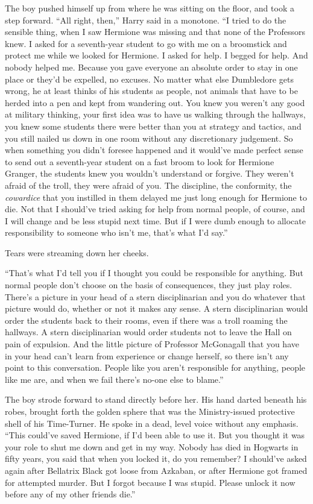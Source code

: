 The boy pushed himself up from where he was sitting on the floor, and took a step forward.
“All right, then,” Harry said in a monotone.
“I tried to do the sensible thing, when I saw Hermione was missing and that none of the Professors knew. I asked for a seventh-year student to go with me on a broomstick and protect me while we looked for Hermione. I asked for help. I begged for help. And nobody helped me. Because you gave everyone an absolute order to stay in one place or they’d be expelled, no excuses. No matter what else Dumbledore gets wrong, he at least thinks of his students as people, not animals that have to be herded into a pen and kept from wandering out. You knew you weren’t any good at military thinking, your first idea was to have us walking through the hallways, you knew some students there were better than you at strategy and tactics, and you still nailed us down in one room without any discretionary judgement. So when something you didn’t foresee happened and it would’ve made perfect sense to send out a seventh-year student on a fast broom to look for Hermione Granger, the students knew you wouldn’t understand or forgive. They weren’t afraid of the troll, they were afraid of you. The discipline, the conformity, the \emph{cowardice} that you instilled in them delayed me just long enough for Hermione to die. Not that I should’ve tried asking for help from normal people, of course, and I will change and be less stupid next time. But if I were dumb enough to allocate responsibility to someone who isn’t me, that’s what I’d say.”

Tears were streaming down her cheeks.

“That’s what I’d tell you if I thought you could be responsible for anything. But normal people don’t choose on the basis of consequences, they just play roles. There’s a picture in your head of a stern disciplinarian and you do whatever that picture would do, whether or not it makes any sense. A stern disciplinarian would order the students back to their rooms, even if there was a troll roaming the hallways. A stern disciplinarian would order students not to leave the Hall on pain of expulsion. And the little picture of Professor McGonagall that you have in your head can’t learn from experience or change herself, so there isn’t any point to this conversation. People like you aren’t responsible for anything, people like me are, and when we fail there’s no-one else to blame.”

The boy strode forward to stand directly before her. His hand darted beneath his robes, brought forth the golden sphere that was the Ministry-issued protective shell of his Time-Turner. He spoke in a dead, level voice without any emphasis.
“This could’ve saved Hermione, if I’d been able to use it. But you thought it was your role to shut me down and get in my way. Nobody has died in Hogwarts in fifty years, you said that when you locked it, do you remember? I should’ve asked again after Bellatrix Black got loose from Azkaban, or after Hermione got framed for attempted murder. But I forgot because I was stupid. Please unlock it now before any of my other friends die.”

